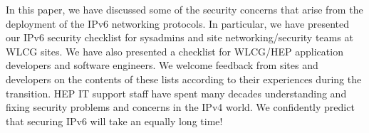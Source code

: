 
In this paper, we have discussed some of the security concerns that arise from the deployment of the IPv6 networking protocols. In particular, we have presented our IPv6 security checklist for sysadmins and site networking/security teams at WLCG sites. We have also presented a checklist for WLCG/HEP application developers and software engineers. We welcome feedback from sites and
developers on the contents of these lists according to their experiences during the transition.  HEP IT support staff have spent many decades understanding and fixing security problems and concerns in the IPv4 world. We confidently predict that securing IPv6 will take an equally long time!